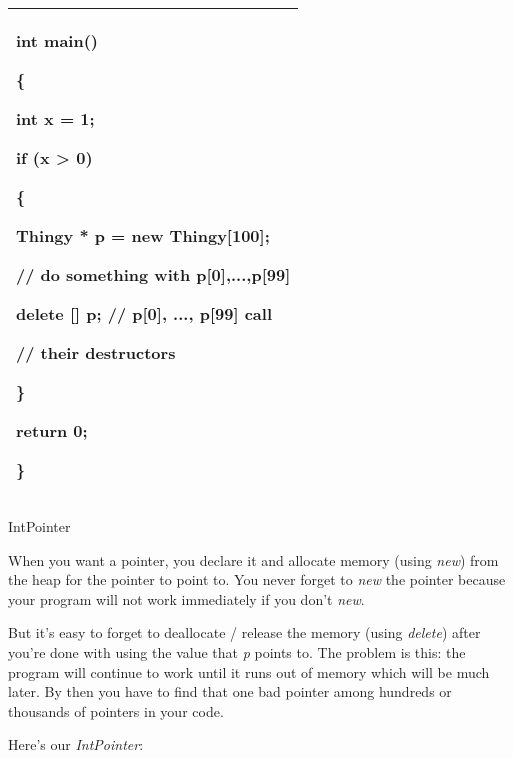 \documentclass[
]{article}
\begin{document}
\begin{longtable}[]{@{}l@{}}
\toprule
\endhead
\begin{minipage}[t]{0.97\columnwidth}\raggedright
int main()

\{

int x = 1;

if (x \textgreater{} 0)

\{

Thingy * p = new Thingy{[}100{]};

// do something with p{[}0{]},...,p{[}99{]}

delete {[}{]} p; // p{[}0{]}, ..., p{[}99{]} call

// their destructors

\}

return 0;

\}\strut
\end{minipage}\tabularnewline
\bottomrule
\end{longtable}

IntPointer

When you want a pointer, you declare it and allocate memory (using
\emph{new}) from the heap for the pointer to point to. You never forget
to \emph{new} the pointer because your program will not work immediately
if you don't \emph{new}.

But it's easy to forget to deallocate / release the memory (using
\emph{delete}) after you're done with using the value that \emph{p}
points to. The problem is this: the program will continue to work until
it runs out of memory which will be much later. By then you have to find
that one bad pointer among hundreds or thousands of pointers in your
code.

Here's our \emph{IntPointer}:
\end{document}
